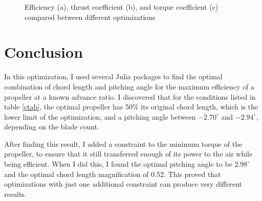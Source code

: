 \documentclass[journal ]{new-aiaa}
\newcounter{ctab}
\begin{document}
\begin{figure}[H]
\centering

	\hspace{1em}
	\caption{Efficiency (a), thrust coefficient (b), and torque coefficient (c) compared between different optimizations}
	\captionsetup{aboveskip=0pt,font=it}
	\label{perspow}
\end{figure}


\section{Conclusion}

In this optimization, I used several Julia packages to find the optimal combination of chord length and pitching angle for the maximum efficiency of a propeller at a known advance ratio. I discovered that for the conditions listed in table \eqref{ctab}, the optimal propeller has 50\% its original chord length, which is the lower limit of the optimization, and a pitching angle between $-2.70^{\circ}$ and $-2.94^{\circ}$, depending on the blade count.

After finding this result, I added a constraint to the minimum torque of the propeller, to ensure that it still transferred enough of its power to the air while being efficient. When I did this, I found the optimal pitching angle to be $2.98^{\circ}$ and the optimal chord length magnification of 0.52. This proved that optimizations with just one additional constraint can produce very different results.
\end{document}
